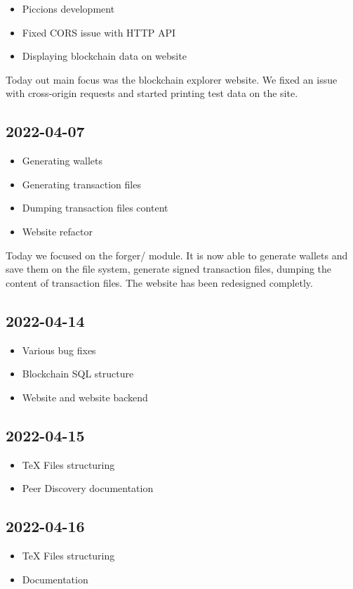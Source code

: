 \documentclass{article}
\begin{document}
\begin{itemize}
    \item Piccions development
    \item Fixed CORS issue with HTTP API
    \item Displaying blockchain data on website
\end{itemize}

Today out main focus was the blockchain explorer website.
We fixed an issue with cross-origin requests and started printing test data
on the site.

\subsection*{2022-04-07}

\begin{itemize}
    \item Generating wallets
    \item Generating transaction files
    \item Dumping transaction files content
    \item Website refactor
\end{itemize}

Today we focused on the forger/ module. It is now able
to generate wallets and save them on the file system, generate 
signed transaction files, dumping the content of transaction files.
The website has been redesigned completly.

\subsection*{2022-04-14}

\begin{itemize}
    \item Various bug fixes
    \item Blockchain SQL structure
    \item Website and website backend
\end{itemize}

\subsection*{2022-04-15}

\begin{itemize}
    \item TeX Files structuring
    \item Peer Discovery documentation
\end{itemize}

\subsection*{2022-04-16}

\begin{itemize}
    \item TeX Files structuring
    \item Documentation
\end{itemize}
\end{document}
